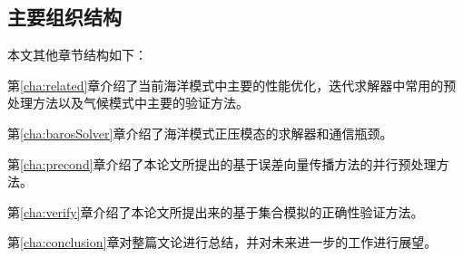 \subsection{主要组织结构}
本文其他章节结构如下：

第\ref{cha:related}章介绍了当前海洋模式中主要的性能优化，迭代求解器中常用的预处理方法以及气候模式中主要的验证方法。

第\ref{cha:barosSolver}章介绍了海洋模式正压模态的求解器和通信瓶颈。

第\ref{cha:precond}章介绍了本论文所提出的基于误差向量传播方法的并行预处理方法。

第\ref{cha:verify}章介绍了本论文所提出来的基于集合模拟的正确性验证方法。 

第\ref{cha:conclusion}章对整篇文论进行总结，并对未来进一步的工作进行展望。


